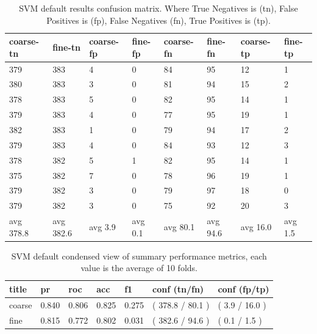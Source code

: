 \documentclass[ms]{nuthesis}
\begin{document}
\FloatBarrier
\begin{table}[H]
\centering
\caption{SVM default results confusion matrix. Where True Negatives is (tn), False Positives is (fp),
False Negatives (fn), True Positives is (tp).}
\label{tab:SVMDefConfMat}
\begin{tabular}{|l||l||l||l||l||l||l||l|}\toprule
coarse-tn & fine-tn & coarse-fp & fine-fp & coarse-fn & fine-fn & coarse-tp & fine-tp \\ \midrule
379 & 383 & 4 & 0 & 84 & 95 & 12 & 1 \\
380 & 383 & 3 & 0 & 81 & 94 & 15 & 2 \\
378 & 383 & 5 & 0 & 82 & 95 & 14 & 1 \\
379 & 383 & 4 & 0 & 77 & 95 & 19 & 1 \\
382 & 383 & 1 & 0 & 79 & 94 & 17 & 2 \\
379 & 383 & 4 & 0 & 84 & 93 & 12 & 3 \\
378 & 382 & 5 & 1 & 82 & 95 & 14 & 1 \\
375 & 382 & 7 & 0 & 78 & 96 & 19 & 1 \\
379 & 382 & 3 & 0 & 79 & 97 & 18 & 0 \\
379 & 382 & 3 & 0 & 75 & 92 & 20 & 3 \\
avg 378.8 & avg 382.6 & avg 3.9 & avg 0.1 & avg 80.1 & avg 94.6 & avg 16.0 & avg 1.5 \\ \bottomrule
\end{tabular}
\end{table}
\FloatBarrier

\FloatBarrier
\begin{table}[H]
\centering
\caption{SVM default condensed view of summary performance metrics, each value is the average
of 10 folds.}
\label{tab:SVMDef}
\begin{tabular}{|l||l||l||l||l||l||l|}\toprule
title & pr & roc & acc & f1 & conf (tn/fn) & conf (fp/tp) \\ \midrule
coarse & 0.840 & 0.806 & 0.825 & 0.275 & ( 378.8 / 80.1 ) & ( 3.9 / 16.0 ) \\
fine & 0.815 & 0.772 & 0.802 & 0.031 & ( 382.6 / 94.6 ) & ( 0.1 / 1.5 ) \\ \bottomrule
\end{tabular}
\end{table}
\FloatBarrier
\end{document}
